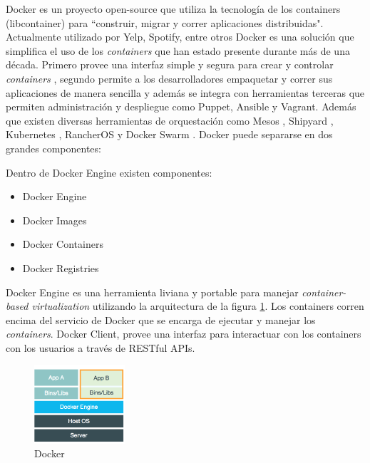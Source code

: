 Docker es un proyecto open-source que utiliza la tecnología de los containers (libcontainer) para ``construir, migrar y correr aplicaciones distribuidas". Actualmente utilizado por Yelp, Spotify, entre otros \cite{Docker:2015:Online, marmolnetworking}
Docker es una solución que simplifica el uso de los \textit{containers} que han estado presente durante más de una década. Primero provee una interfaz simple y segura para crear y controlar \textit{containers} \cite{bui2015analysis}, segundo permite a los desarrolladores empaquetar y correr sus aplicaciones de manera sencilla y además se integra con herramientas terceras que permiten administración y despliegue como Puppet, Ansible y Vagrant. Además que existen diversas herramientas de orquestación como Mesos \cite{Apach91:online}, Shipyard \cite{shipy13:online}, Kubernetes \cite{kubernetes:2015:Online}, RancherOS \cite{Ranch38:online} y Docker Swarm	 \cite{Docke38:online}.
  Docker puede separarse en dos grandes componentes: 
  
  	Dentro de Docker Engine existen  componentes: 
	\begin{itemize}
		\item Docker Engine
		\item Docker Images
		\item Docker Containers
		\item Docker Registries
	\end{itemize}
	

Docker Engine es una herramienta liviana y portable para manejar \textit{container-based virtualization} utilizando la arquitectura de la figura \ref{fig:docker}. Los containers corren encima del servicio de Docker que se encarga de ejecutar y manejar los \textit{containers}. Docker Client, provee una interfaz para interactuar con los containers con los usuarios a través de RESTful APIs\cite{bui2015analysis}.\\

\begin{figure}[]
  \centering
    \includegraphics[width=0.3\textwidth]{Figures/docker.png}
    \caption{Docker}
    \label{fig:docker}
\end{figure}

